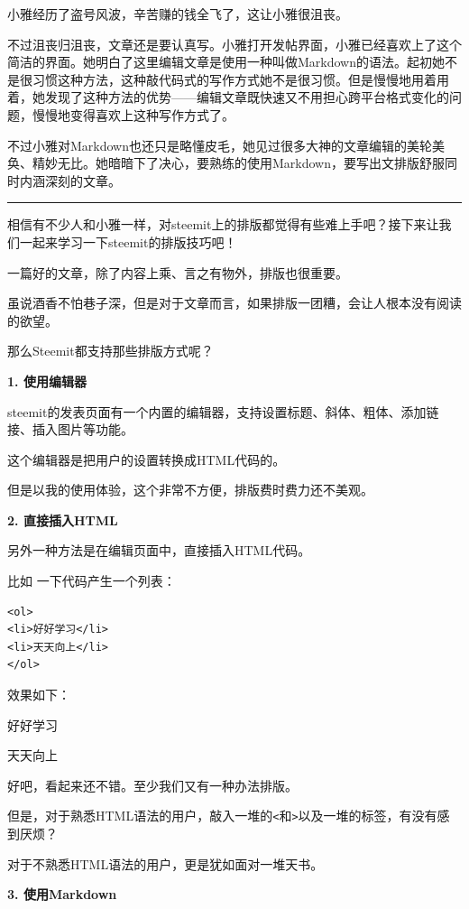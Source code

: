 \documentclass[]{ctexbook}
\begin{document}
小雅经历了盗号风波，辛苦赚的钱全飞了，这让小雅很沮丧。

不过沮丧归沮丧，文章还是要认真写。小雅打开发帖界面，小雅已经喜欢上了这个简洁的界面。她明白了这里编辑文章是使用一种叫做Markdown的语法。起初她不是很习惯这种方法，这种敲代码式的写作方式她不是很习惯。但是慢慢地用着用着，她发现了这种方法的优势------编辑文章既快速又不用担心跨平台格式变化的问题，慢慢地变得喜欢上这种写作方式了。

不过小雅对Markdown也还只是略懂皮毛，她见过很多大神的文章编辑的美轮美奂、精妙无比。她暗暗下了决心，要熟练的使用Markdown，要写出文排版舒服同时内涵深刻的文章。

\begin{center}\rule{0.5\linewidth}{\linethickness}\end{center}

相信有不少人和小雅一样，对steemit上的排版都觉得有些难上手吧？接下来让我们一起来学习一下steemit的排版技巧吧！

一篇好的文章，除了内容上乘、言之有物外，排版也很重要。

虽说酒香不怕巷子深，但是对于文章而言，如果排版一团糟，会让人根本没有阅读的欲望。

那么Steemit都支持那些排版方式呢？

\textbf{1. 使用编辑器}

steemit的发表页面有一个内置的编辑器，支持设置标题、斜体、粗体、添加链接、插入图片等功能。

这个编辑器是把用户的设置转换成HTML代码的。

但是以我的使用体验，这个非常不方便，排版费时费力还不美观。

\textbf{2. 直接插入HTML}

另外一种方法是在编辑页面中，直接插入HTML代码。

比如 一下代码产生一个列表：

\begin{verbatim}
<ol>
<li>好好学习</li>
<li>天天向上</li>
</ol>
\end{verbatim}

效果如下：

好好学习

天天向上

好吧，看起来还不错。至少我们又有一种办法排版。

但是，对于熟悉HTML语法的用户，敲入一堆的\texttt{\textless{}}和\texttt{\textgreater{}}以及一堆的标签，有没有感到厌烦？

对于不熟悉HTML语法的用户，更是犹如面对一堆天书。

\textbf{3. 使用Markdown}
\end{document}
